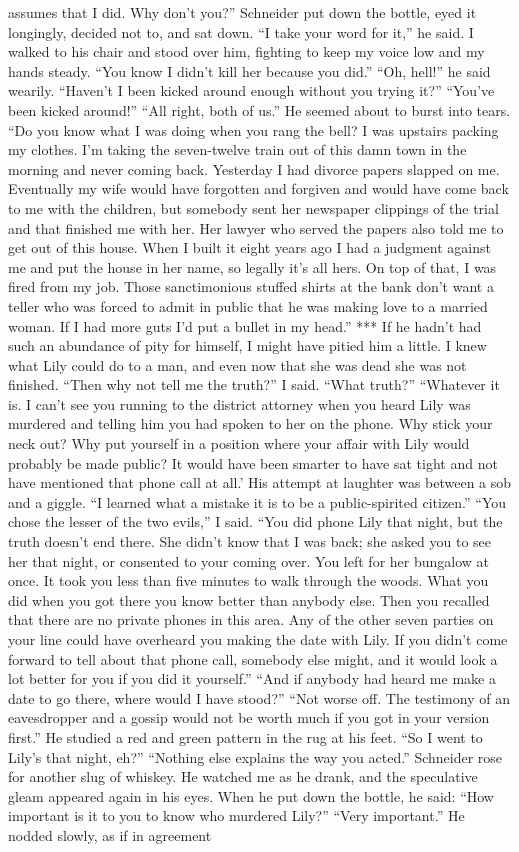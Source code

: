 \documentclass{novel}
\begin{document}
assumes that I did. Why don’t you?” Schneider put down the bottle, eyed it longingly, decided not to, and sat down. “I take your word for it,” he said. I walked to his chair and stood over him, fighting to keep my voice low and my hands steady. “You know I didn’t kill her because you did.” “Oh, hell!” he said wearily. “Haven’t I been kicked around enough without you trying it?” “You’ve been kicked around!” “All right, both of us.” He seemed about to burst into tears. “Do you know what I was doing when you rang the bell? I was upstairs packing my clothes. I’m taking the seven-twelve train out of this damn town in the morning and never coming back. Yesterday I had divorce papers slapped on me. Eventually my wife would have forgotten and forgiven and would have come back to me with the children, but somebody sent her newspaper clippings of the trial and that finished me with her. Her lawyer who served the papers also told me to get out of this house. When I built it eight years ago I had a judgment against me and put the house in her name, so legally it’s all hers. On top of that, I was fired from my job. Those sanctimonious stuffed shirts at the bank don’t want a teller who was forced to admit in public that he was making love to a married woman. If I had more guts I’d put a bullet in my head.” *** If he hadn’t had such an abundance of pity for himself, I might have pitied him a little. I knew what Lily could do to a man, and even now that she was dead she was not finished. “Then why not tell me the truth?” I said. “What truth?” “Whatever it is. I can’t see you running to the district attorney when you heard Lily was murdered and telling him you had spoken to her on the phone. Why stick your neck out? Why put yourself in a position where your affair with Lily would probably be made public? It would have been smarter to have sat tight and not have mentioned that phone call at all.’ His attempt at laughter was between a sob and a giggle. “I learned what a mistake it is to be a public-spirited citizen.” “You chose the lesser of the two evils,” I said. “You did phone Lily that night, but the truth doesn’t end there. She didn’t know that I was back; she asked you to see her that night, or consented to your coming over. You left for her bungalow at once. It took you less than five minutes to walk through the woods. What you did when you got there you know better than anybody else. Then you recalled that there are no private phones in this area. Any of the other seven parties on your line could have overheard you making the date with Lily. If you didn’t come forward to tell about that phone call, somebody else might, and it would look a lot better for you if you did it yourself.” “And if anybody had heard me make a date to go there, where would I have stood?” “Not worse off. The testimony of an eavesdropper and a gossip would not be worth much if you got in your version first.” He studied a red and green pattern in the rug at his feet. “So I went to Lily’s that night, eh?” “Nothing else explains the way you acted.” Schneider rose for another slug of whiskey. He watched me as he drank, and the speculative gleam appeared again in his eyes. When he put down the bottle, he said: “How important is it to you to know who murdered Lily?” “Very important.” He nodded slowly, as if in agreement 
\end{document}
